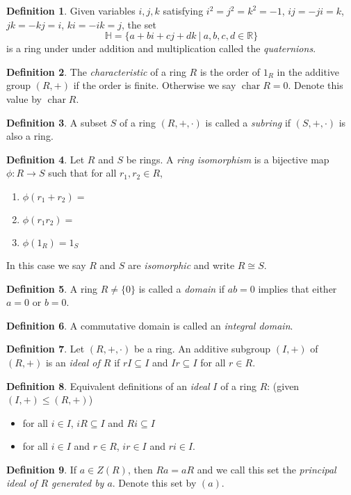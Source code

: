 \documentclass[12pt]{article}
\newcommand{\enumarabic}[1]{
	\begin{enumerate}[label=\textbf{\arabic*.}]
		#1
	\end{enumerate}
}
\theoremstyle{definition}
\newtheorem*{defn}{Definition}
\newcommand{\R}{\mathbb{R}}
\newcommand{\bulletize}[1]{%
	\begin{itemize}
		#1
	\end{itemize}
}
\begin{document}
\begin{defn}
	Given variables $i,j,k$ satisfying  $i^2=j^2=k^2=-1$, $ij=-ji=k$, $jk=-kj=i$, $ki=-ik=j$, the set
	\[\mathbb{H}=\{a+bi+cj+dk\ |\ a,b,c,d\in\R\}\]
	is a ring under under addition and multiplication called the \emph{quaternions}. 
\end{defn}
\begin{defn}
	The \emph{characteristic} of a ring $R$ is the order of $1_R$ in the additive group $(R,+)$ if the order is finite.  Otherwise we say $\operatorname{char} R=0$.  Denote this value by $\operatorname{char} R$.
\end{defn}
\begin{defn}
	A subset $S$ of a ring $(R,+,\cdot)$ is called a \emph{subring} if $(S,+,\cdot)$ is also a ring.
\end{defn}
\begin{defn}
	Let $R$ and $S$ be rings. A \emph{ring isomorphism} is a bijective map $\phi:R\to S$ such that for all $r_1,r_2\in R$,
	\enumarabic{
		\item $\phi(r_1+r_2)=$
		\item $\phi(r_1r_2)=$
		\item $\phi(1_R)=1_S$
	}
	In this case we say $R$ and $S$ are \emph{isomorphic} and write $R\cong S$.
\end{defn}
\begin{defn}
	A ring $R\neq\{0\}$ is called a \emph{domain} if $ab=0$ implies that either $a=0$ or $b=0$.
\end{defn}
\begin{defn}
	A commutative domain is called an \emph{integral domain}.
\end{defn}
\begin{defn}
	Let $(R,+,\cdot)$ be a ring. An additive subgroup $(I,+)$ of $(R,+)$ is an \emph{ideal of $R$} if $rI\subseteq I$ and $Ir\subseteq I$ for all $r\in R$.
\end{defn}
\begin{defn}
	Equivalent definitions of an \emph{ideal} $I$ of a ring $R$: (given $(I,+)\leq (R,+)$)
	\bulletize{
		\item for all $i\in I$, $iR\subseteq I$ and $Ri\subseteq I$
		\item for all $i\in I$ and $r\in R$, $ir\in I$ and $ri\in I$.
	}
\end{defn}
\begin{defn}
	If $a\in Z(R)$, then $Ra=aR$ and we call this set the \emph{principal ideal of $R$ generated by $a$}.  Denote this set by $(a)$.
\end{defn}
\end{document}
